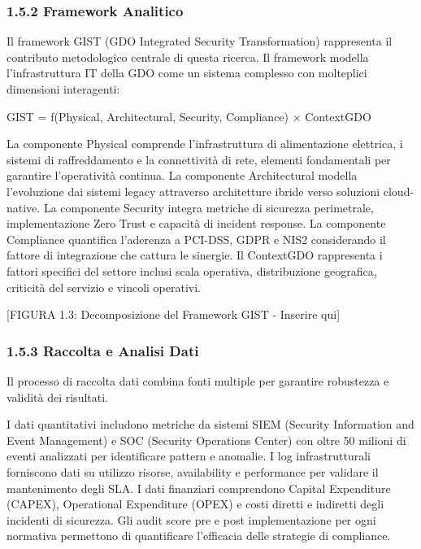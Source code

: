 \documentclass{report}
\begin{document}
\subsubsection{\texorpdfstring{\textbf{1.5.2 Framework
Analitico}}{1.5.2 Framework Analitico}}\label{framework-analitico}

Il framework GIST (GDO Integrated Security Transformation) rappresenta
il contributo metodologico centrale di questa ricerca. Il framework
modella l'infrastruttura IT della GDO come un sistema complesso con
molteplici dimensioni interagenti:

GIST = f(Physical, Architectural, Security, Compliance) × ContextGDO

La componente Physical comprende l'infrastruttura di alimentazione
elettrica, i sistemi di raffreddamento e la connettività di rete,
elementi fondamentali per garantire l'operatività continua. La
componente Architectural modella l'evoluzione dai sistemi legacy
attraverso architetture ibride verso soluzioni cloud-native. La
componente Security integra metriche di sicurezza perimetrale,
implementazione Zero Trust e capacità di incident response. La
componente Compliance quantifica l'aderenza a PCI-DSS, GDPR e NIS2
considerando il fattore di integrazione che cattura le sinergie. Il
ContextGDO rappresenta i fattori specifici del settore inclusi scala
operativa, distribuzione geografica, criticità del servizio e vincoli
operativi.

{[}FIGURA 1.3: Decomposizione del Framework GIST - Inserire qui{]}

\subsubsection{\texorpdfstring{\textbf{1.5.3 Raccolta e Analisi
Dati}}{1.5.3 Raccolta e Analisi Dati}}\label{raccolta-e-analisi-dati}

Il processo di raccolta dati combina fonti multiple per garantire
robustezza e validità dei risultati.

I dati quantitativi includono metriche da sistemi SIEM (Security
Information and Event Management) e SOC (Security Operations Center) con
oltre 50 milioni di eventi analizzati per identificare pattern e
anomalie. I log infrastrutturali forniscono dati su utilizzo risorse,
availability e performance per validare il mantenimento degli SLA. I
dati finanziari comprendono Capital Expenditure (CAPEX), Operational
Expenditure (OPEX) e costi diretti e indiretti degli incidenti di
sicurezza. Gli audit score pre e post implementazione per ogni normativa
permettono di quantificare l'efficacia delle strategie di compliance.
\end{document}

